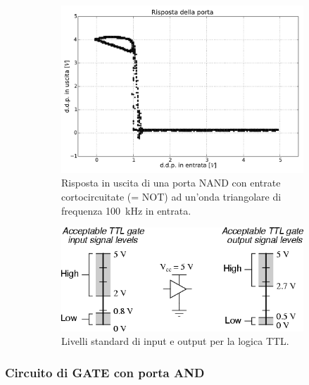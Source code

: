 \begin{figure}[htpc]
\centering
	\begin{subfigure}[hc]{0.49\textwidth}
		\centering
		\includegraphics[width=.95\textwidth]{../E09/latex/XY.pdf}
                \caption{Risposta in uscita di una porta NAND con entrate cortocircuitate (= NOT) ad un'onda triangolare di frequenza \SI{100}{\kHz} in entrata.}
                \label{fig9:XY}
        \end{subfigure}%
	\quad
        \begin{subfigure}[hc]{0.49\textwidth}
		\centering
		\includegraphics[width=.95\textwidth]{../E09/latex/TTL.png}
                \caption{Livelli standard di input e output per la logica TTL.}
                \label{fig9:TTL}
        \end{subfigure}
\caption{}
\end{figure}
\vspace{-5mm}

\subsubsection{Circuito di GATE con porta AND}

